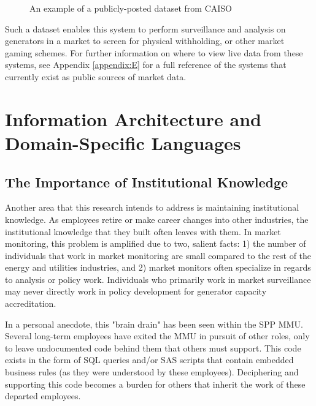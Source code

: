 \begin{figure}[ht]
\centering
{}
\caption{An example of a publicly-posted dataset from CAISO}
\label{fig:caiso-outage-example}
\end{figure}

Such a dataset enables this system to perform surveillance and analysis on generators in a market to screen for physical withholding, or other market gaming schemes. For further information on where to view live data from these systems, see Appendix \ref{appendix:E} for a full reference of the systems that currently exist as public sources of market data. 

\section{Information Architecture and Domain-Specific Languages}

\subsection{The Importance of Institutional Knowledge}

Another area that this research intends to address is maintaining institutional knowledge. As employees retire or make career changes into other industries, the institutional knowledge that they built often leaves with them. In market monitoring, this problem is amplified due to two, salient facts: 1) the number of individuals that work in market monitoring are small compared to the rest of the energy and utilities industries, and 2) market monitors often specialize in regards to analysis or policy work. Individuals who primarily work in market surveillance may never directly work in policy development for generator capacity accreditation.

In a personal anecdote, this "brain drain" has been seen within the SPP MMU. Several long-term employees have exited the MMU in pursuit of other roles, only to leave undocumented code behind them that others must support. This code exists in the form of SQL queries and/or SAS scripts that contain embedded business rules (as they were understood by these employees). Deciphering and supporting this code becomes a burden for others that inherit the work of these departed employees.

